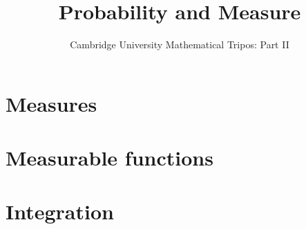 \documentclass{article}
\title{Probability and Measure}
\author{Cambridge University Mathematical Tripos: Part II}
\begin{document}
\maketitle

\tableofcontentsnewpage{}

\section{Measures}

\section{Measurable functions}

\section{Integration}

\end{document}
